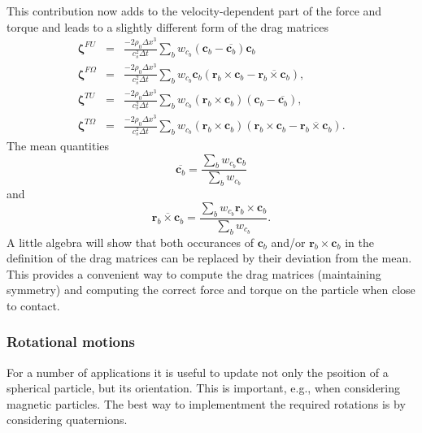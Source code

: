 This contribution
now adds to the velocity-dependent part of the force and torque and
leads to a slightly different form of the drag matrices
\begin{eqnarray}
\boldsymbol{\zeta}^{FU} &=& \frac{-2\rho_0 \Delta x^3}{c_s^2 \Delta t}
\sum_b w_{c_b} (\mathbf{c}_b - \overline{\mathbf{c}_b}) \mathbf{c}_b
\\
\boldsymbol{\zeta}^{F\Omega} &=& \frac{-2\rho_0 \Delta x^3}{c_s^2 \Delta t}
\sum_b w_{c_b} \mathbf{c}_b (\mathbf{r}_b \times \mathbf{c}_b -
\overline{\mathbf{r}_b\times\mathbf{c}_b}),
\\
\boldsymbol{\zeta}^{TU} &=& \frac{-2\rho_0 \Delta x^3}{c_s^2 \Delta t}
\sum_b w_{c_b} (\mathbf{r}_b\times\mathbf{c}_b)
(\mathbf{c}_b - \overline{\mathbf{c}_b}),
\\
\boldsymbol{\zeta}^{T\Omega} &=& \frac{-2\rho_0 \Delta x^3}{c_s^2 \Delta t}
\sum_b w_{c_b} (\mathbf{r}_b\times\mathbf{c}_b)
(\mathbf{r}_b\times\mathbf{c}_b - \overline{\mathbf{r}_b\times\mathbf{c}_b}).
\end{eqnarray}
The mean quantities
\begin{equation}
\overline{\mathbf{c}_b} = \frac{\sum_b w_{c_b} \mathbf{c}_b}{ \sum_b w_{c_b}}
\end{equation}
and
\begin{equation}
\overline{\mathbf{r}_b\times\mathbf{c}_b} =
\frac{\sum_b w_{c_b} \mathbf{r}_b\times\mathbf{c}_b}{\sum_b w_{c_b}}.
\end{equation}
A little algebra will show that both occurances of $\mathbf{c}_b$ and/or
$\mathbf{r}_b\times\mathbf{c}_b$ in the definition of the drag matrices
can be replaced by their deviation from the mean. This provides a
convenient way to compute the drag matrices (maintaining symmetry)
and computing the correct force and torque on the particle when close
to contact.



\subsubsection{Rotational motions}


For a number of applications it is useful to update not only
the psoition of a spherical particle, but its orientation. This
is important, e.g., when considering magnetic particles. The
best way to implementment the required rotations is by
considering quaternions.

